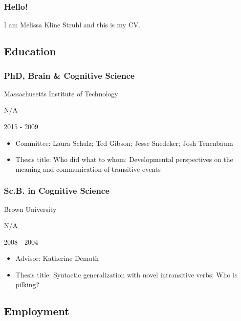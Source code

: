 \documentclass[
]{article}
\providecommand{\tightlist}{%
  \setlength{\itemsep}{0pt}\setlength{\parskip}{0pt}}
\begin{document}
\hypertarget{hello}{%
\subsubsection{Hello!}\label{hello}}

I am Melissa Kline Struhl and this is my CV.

\hypertarget{education}{%
\subsection{Education}\label{education}}

\hypertarget{phd-brain-cognitive-science}{%
\subsubsection{PhD, Brain \& Cognitive
Science}\label{phd-brain-cognitive-science}}

Massachusetts Institute of Technology

N/A

2015 - 2009

\begin{itemize}
\tightlist
\item
  Committee: Laura Schulz; Ted Gibson; Jesse Snedeker; Josh Tenenbaum
\item
  Thesis title: Who did what to whom: Developmental perspectives on the
  meaning and communication of transitive events
\end{itemize}

\hypertarget{sc.b.-in-cognitive-science}{%
\subsubsection{Sc.B. in Cognitive
Science}\label{sc.b.-in-cognitive-science}}

Brown University

N/A

2008 - 2004

\begin{itemize}
\tightlist
\item
  Advisor: Katherine Demuth
\item
  Thesis title: Syntactic generalization with novel intransitive verbs:
  Who is pilking?
\end{itemize}

\hypertarget{employment}{%
\subsection{Employment}\label{employment}}
\end{document}

